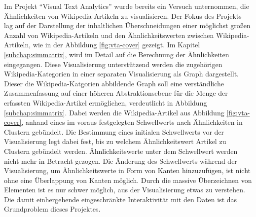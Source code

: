 Im Projekt "`Visual Text Analytics"' wurde bereits ein Versuch unternommen, die Ähnlichkeiten von Wikipedia-Artikeln zu visualisieren.
Der Fokus des Projekts lag auf der Darstellung der inhaltlichen Überschneidungen einer möglichst großen Anzahl von Wikipedia-Artikeln und den Ähnlichkeitswerten zwischen Wikipedia-Artikeln, wie in der Abbildung \ref{fig:vta-cover} gezeigt.
Im Kapitel \ref{subchap:simmatrix}, wird im Detail auf die Berechnung der Ähnlichkeiten eingegangen.
Diese Visualisierung unterstützend werden die zugehörigen Wikipedia-Kategorien in einer separaten Visualisierung als Graph dargestellt.
Dieser die Wikipedia-Katgorien abbildende Graph soll eine verständliche Zusammenfassung auf einer höheren Abstraktionsebene für die Menge der erfassten Wikipedia-Artikel ermöglichen, verdeutlicht in Abbildung \ref{subchap:simmatrix}. 
Dabei werden die Wikipedia-Artikel aus Abbildung \ref{fig:vta-cover}, anhand eines im voraus festgelegten Schwellwerts nach Ähnlichkeiten in Clustern gebündelt.
Die Bestimmung eines initialen Schwellwerts vor der Visualisierung legt dabei fest, bis zu welchem Ähnlichkeitswert Artikel zu Clustern gebündelt werden. Ähnlichkeitswerte unter dem Schwellwert werden nicht mehr in Betracht gezogen. 
Die Änderung des Schwellwerts während der Visualisierung, um Ähnlichkeitswerte in Form von Kanten hinzuzufügen, ist nicht ohne eine Überlappung von Kanten möglich.
Durch die massive Überzeichnen von Elementen ist es nur schwer möglich, aus der Visualisierung etwas zu verstehen. Die damit einhergehende eingeschränkte Interaktivität mit den Daten ist das Grundproblem dieses Projektes.



